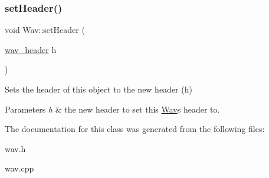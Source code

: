 \subsubsection{\texorpdfstring{set\+Header()}{setHeader()}}
{\footnotesize\ttfamily void Wav\+::set\+Header (\begin{DoxyParamCaption}\item[{\hyperlink{structwav__header}{wav\+\_\+header}}]{h }\end{DoxyParamCaption})}

Sets the header of this object to the new header (h) 
\begin{DoxyParams}{Parameters}
{\em h} & the new header to set this \hyperlink{classWav}{Wav}\textquotesingle{}s header to. \\
\hline
\end{DoxyParams}


The documentation for this class was generated from the following files\+:\begin{DoxyCompactItemize}
\item 
wav.\+h\item 
wav.\+cpp\end{DoxyCompactItemize}
